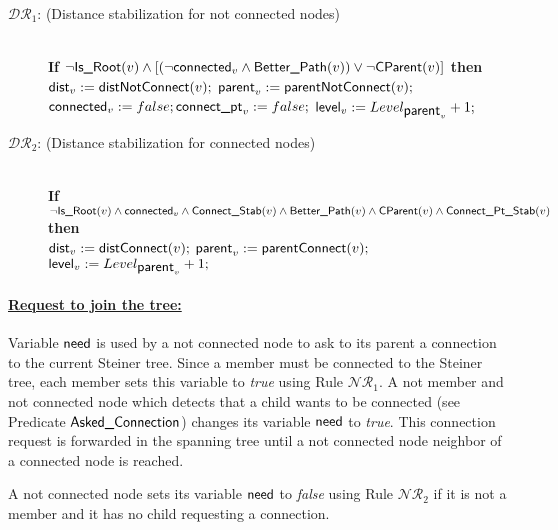 \documentclass[11pt]{article}
\newcommand{\parent}{\mbox{\sf parent}}
\newcommand{\level}{\mbox{\sf level}}
\newcommand{\dist}{\mbox{\sf dist}}
\newcommand{\need}{\mbox{\sf need}}
\newcommand{\connect}{\mbox{\sf connected}}
\newcommand{\connectpt}{\mbox{\sf connect\_pt}}
\newcommand{\IsRoot}{\mbox{\sf Is\_Root}}
\newcommand{\CParent}{\mbox{\sf CParent}}
\newcommand{\distConnect}{\mbox{\sf distConnect}}
\newcommand{\distNotConnect}{\mbox{\sf distNotConnect}}
\newcommand{\parentConnect}{\mbox{\sf parentConnect}}
\newcommand{\parentNotConnect}{\mbox{\sf parentNotConnect}}
\newcommand{\Better}{\mbox{\sf Better\_Path}}
\newcommand{\Ask}{\mbox{\sf Asked\_Connection}}
\newcommand{\ConnectS}{\mbox{\sf Connect\_Stab}}
\newcommand{\ConnectPtS}{\mbox{\sf Connect\_Pt\_Stab}}
\newcommand{\ARA}{$\mathcal{DR}_1$}
\newcommand{\ARB}{$\mathcal{DR}_2$}
\newcommand{\CRB}{$\mathcal{NR}_1$}
\newcommand{\CRC}{$\mathcal{NR}_2$}
\begin{document}
\begin{small}
\begin{description}
\item[\ARA : (Distance stabilization for not connected nodes)]~\\\textbf{If} $\neg \IsRoot(v) \wedge [(\neg \connect_v \wedge \Better(v)) \vee \neg \CParent(v)]$ \textbf{then}\\ 
\hspace*{0,8cm}$\dist_v:=\distNotConnect(v);$ $\parent_v:=\parentNotConnect(v);$\\
\hspace*{0,8cm}$ \connect_v:=false;\connectpt_v:=false;$ $\level_v:=Level_{\parent_v}+1;$

\item[\ARB: (Distance stabilization for connected nodes)]~\\\textbf{If} $\neg \IsRoot(v) \wedge \connect_v \wedge \ConnectS(v) \wedge \Better(v) \wedge \CParent(v) \wedge \ConnectPtS(v)$ \textbf{then}\\ \hspace*{0,8cm}$\dist_v:=\distConnect(v);$ $\parent_v:=\parentConnect(v);$\\
\hspace*{0,8cm}$ \level_v:=Level_{\parent_v}+1;$
\end{description}
\end{small}
\paragraph{\underline{Request to join the tree:}}

Variable $\need$ is used by a not connected node to ask to its parent
a connection to the current Steiner tree. 
Since a member must be connected to the Steiner tree, each member sets
this variable to \emph{true} using Rule \CRB. 
A not member and not connected node which detects that a child wants
to be connected (see Predicate $\Ask$) 
changes its variable $\need$ to \emph{true}. This connection request
is forwarded in the spanning 
tree until a not connected node neighbor of a connected node is
reached.

A not connected node sets its variable $\need$ to \emph{false} using
Rule \CRC\/ if it is not a member and it has no child requesting a
connection. 
\end{document}
